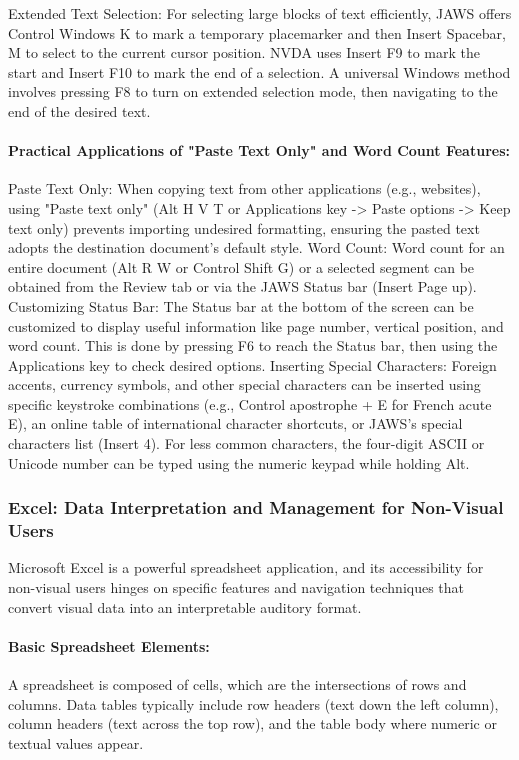 Extended Text Selection: For selecting large blocks of text efficiently, JAWS offers Control Windows K to mark a temporary placemarker and then Insert Spacebar, M to select to the current cursor position.\supercite{kingsbury2025} NVDA uses Insert F9 to mark the start and Insert F10 to mark the end of a selection.\supercite{kingsbury2025} A universal Windows method involves pressing F8 to turn on extended selection mode, then navigating to the end of the desired text.\supercite{kingsbury2025}
\paragraph{Practical Applications of "Paste Text Only" and Word Count Features:}
Paste Text Only: When copying text from other applications (e.g., websites), using "Paste text only" (Alt H V T or Applications key -\textgreater{} Paste options -\textgreater{} Keep text only) prevents importing undesired formatting, ensuring the pasted text adopts the destination document's default style.\supercite{kingsbury2025}
Word Count: Word count for an entire document (Alt R W or Control Shift G) or a selected segment can be obtained from the Review tab or via the JAWS Status bar (Insert Page up).\supercite{kingsbury2025}
Customizing Status Bar: The Status bar at the bottom of the screen can be customized to display useful information like page number, vertical position, and word count. This is done by pressing F6 to reach the Status bar, then using the Applications key to check desired options.\supercite{kingsbury2025}
Inserting Special Characters: Foreign accents, currency symbols, and other special characters can be inserted using specific keystroke combinations (e.g., Control apostrophe + E for French acute E), an online table of international character shortcuts, or JAWS's special characters list (Insert 4).\supercite{kingsbury2025} For less common characters, the four-digit ASCII or Unicode number can be typed using the numeric keypad while holding Alt.\supercite{kingsbury2025}

\subsubsection{Excel: Data Interpretation and Management for Non-Visual Users}
Microsoft Excel is a powerful spreadsheet application, and its accessibility for non-visual users hinges on specific features and navigation techniques that convert visual data into an interpretable auditory format.
\paragraph{Basic Spreadsheet Elements:}
A spreadsheet is composed of cells, which are the intersections of rows and columns.\supercite{kingsbury2025} Data tables typically include row headers (text down the left column), column headers (text across the top row), and the table body where numeric or textual values appear.\supercite{kingsbury2025}
